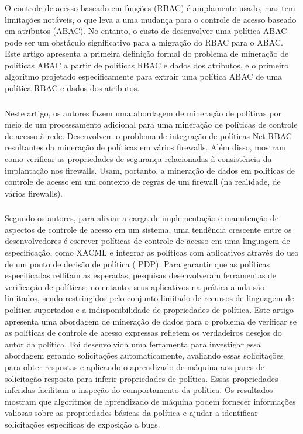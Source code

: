 \subsubsection{ }
O controle de acesso baseado em funções (RBAC) é amplamente usado, mas tem limitações notáveis, o que leva a uma mudança para o controle de acesso baseado em atributos (ABAC). No entanto, o custo de desenvolver uma política ABAC pode ser um obstáculo significativo para a migração do RBAC para o ABAC. Este artigo apresenta a primeira definição formal do problema de mineração de políticas ABAC a partir de políticas RBAC e dados dos atributos, e o primeiro algoritmo projetado especificamente para extrair uma política ABAC de uma política RBAC e dados dos atributos.

\subsubsection{ }
Neste artigo, os autores fazem uma abordagem de mineração de políticas por meio de um processamento adicional para uma mineração de políticas de controle de acesso à rede. Desenvolvem o problema de integração de políticas Net-RBAC resultantes da mineração de políticas em vários firewalls. Além disso, mostram como verificar as propriedades de segurança relacionadas à consistência da implantação nos firewalls. Usam, portanto, a mineração de dados em políticas de controle de acesso em um contexto de regras de um firewall (na realidade, de vários firewalls).

\subsubsection{}
Segundo os autores, para aliviar a carga de implementação e manutenção de aspectos de controle de acesso em um sistema, uma tendência crescente entre os desenvolvedores é escrever políticas de controle de acesso em uma linguagem de especificação, como XACML e integrar as políticas com aplicativos através do uso de um ponto de decisão de política ( PDP). Para garantir que as políticas especificadas reflitam as esperadas, pesquisas desenvolveram ferramentas de verificação de políticas; no entanto, seus aplicativos na prática ainda são limitados, sendo restringidos pelo conjunto limitado de recursos de linguagem de política suportados e a indisponibilidade de propriedades de política. Este artigo apresenta uma abordagem de mineração de dados para o problema de verificar se as políticas de controle de acesso expressas refletem os verdadeiros desejos do autor da política. Foi desenvolvida uma ferramenta para investigar essa abordagem gerando solicitações automaticamente, avaliando essas solicitações para obter respostas e aplicando o aprendizado de máquina aos pares de solicitação-resposta para inferir propriedades de política. Essas propriedades inferidas facilitam a inspeção do comportamento da política. Os resultados mostram que algoritmos de aprendizado de máquina podem fornecer informações valiosas sobre as propriedades básicas da política e ajudar a identificar solicitações específicas de exposição a bugs.

